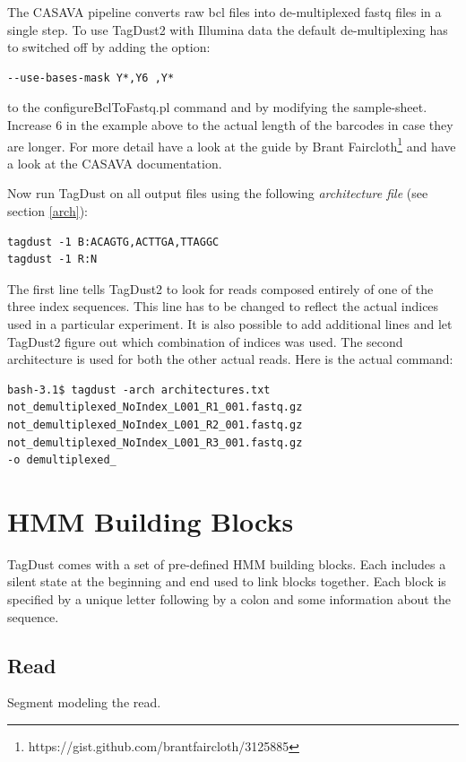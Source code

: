 \documentclass[11pt,a4paper,oneside]{book}
\begin{document}
The CASAVA pipeline converts raw bcl files into de-multiplexed fastq files in a single step. To use TagDust2 with Illumina data the default de-multiplexing has to switched off by adding the option: 
\begin{verbatim}
--use-bases-mask Y*,Y6 ,Y*
\end{verbatim}
to the configureBclToFastq.pl command and by modifying the sample-sheet. Increase 6 in the example above to the actual length of the barcodes in case they are longer. For more detail have a look at the guide by Brant Faircloth\footnote{https://gist.github.com/brantfaircloth/3125885} and have a look at the CASAVA documentation.

Now run TagDust on all output files using the following {\it architecture file} (see section \ref{arch}): 
\begin{verbatim}
tagdust -1 B:ACAGTG,ACTTGA,TTAGGC 
tagdust -1 R:N 
\end{verbatim}
The first line tells TagDust2 to look for reads composed entirely of one of the three index sequences. This line has to be changed to reflect the actual indices used in a particular experiment. It is also possible to add additional lines and let TagDust2 figure out which combination of indices was used. The second architecture is used for both the other actual reads. Here is the actual command:
 \begin{verbatim}
bash-3.1$ tagdust -arch architectures.txt not_demultiplexed_NoIndex_L001_R1_001.fastq.gz
not_demultiplexed_NoIndex_L001_R2_001.fastq.gz not_demultiplexed_NoIndex_L001_R3_001.fastq.gz
-o demultiplexed_
\end{verbatim}



\newpage

\chapter{HMM Building Blocks}
TagDust comes with a set of pre-defined HMM building blocks. Each includes a silent state at the beginning and end used to link blocks together. Each block is specified by a unique letter following by a colon and some information about the sequence. 


\section{Read}
Segment modeling the read. \\
\end{document}
